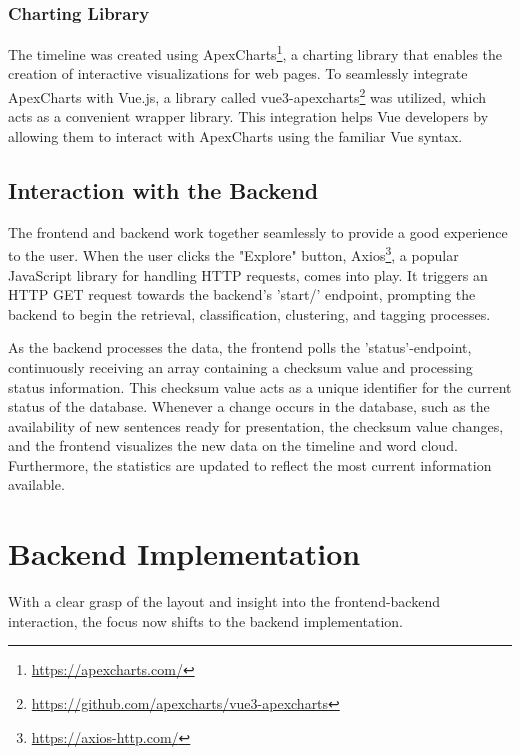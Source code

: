\documentclass[a4paper,10pt]{report}
\begin{document}

\subsubsection{Charting Library}
The timeline was created using ApexCharts\footnote{\url{https://apexcharts.com/}}, a charting library that enables the creation of interactive visualizations for web pages. To seamlessly integrate ApexCharts with Vue.js, a library called vue3-apexcharts\footnote{\url{https://github.com/apexcharts/vue3-apexcharts}} was utilized, which acts as a convenient wrapper library. This integration helps Vue developers by allowing them to interact with ApexCharts using the familiar Vue syntax.

\subsection{Interaction with the Backend}
The frontend and backend work together seamlessly to provide a good experience to the user. When the user clicks the "Explore" button, Axios\footnote{\url{https://axios-http.com/}}, a popular JavaScript library for handling HTTP requests, comes into play. It triggers an HTTP GET request towards the backend's 'start/' endpoint, prompting the backend to begin the retrieval, classification, clustering, and tagging processes.

As the backend processes the data, the frontend polls the 'status'-endpoint, continuously receiving an array containing a checksum value and processing status information. This checksum value acts as a unique identifier for the current status of the database. Whenever a change occurs in the database, such as the availability of new sentences ready for presentation, the checksum value changes, and the frontend visualizes the new data on the timeline and word cloud. Furthermore, the statistics are updated to reflect the most current information available.


\section{Backend Implementation}
With a clear grasp of the layout and insight into the frontend-backend interaction, the focus now shifts to the backend implementation.
\end{document}
